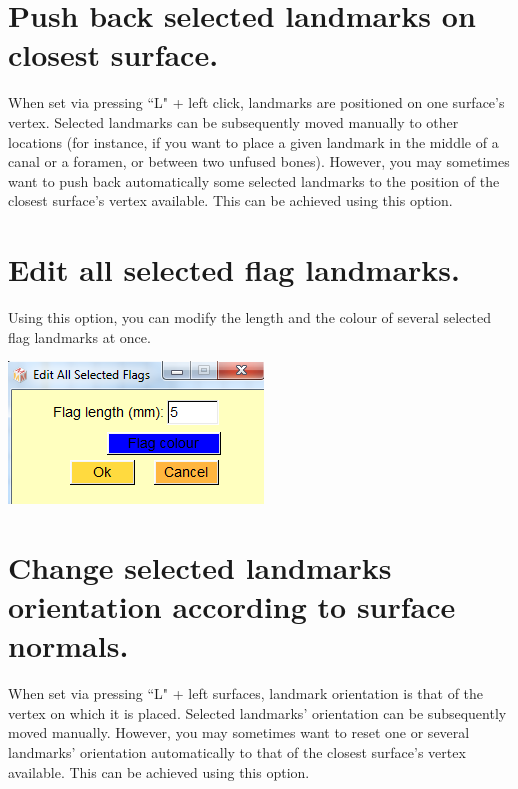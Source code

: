 \section{Push back selected landmarks on closest surface.}
When set via pressing ``L" + left click, landmarks are positioned on one surface’s vertex. Selected
landmarks can be subsequently moved manually to other locations (for instance, if you want to place
a given landmark in the middle of a canal or a foramen, or between two unfused bones). However,
you may sometimes want to push back automatically some selected landmarks to the position of the
closest surface’s vertex available. This can be achieved using this option.


\section{Edit all selected flag landmarks.}
\noindent
\begin{minipage}{0.5\textwidth}
Using this option, you can modify the length and the colour
of several selected flag landmarks at once.
\end{minipage}    
\begin{minipage}{0.5\textwidth}\centering
  \includegraphics[scale=0.5]{images/Edit_selected_landmarks/Edit_flags.png}
 \end{minipage} 
\noindent





\section{Change selected landmarks orientation according to surface normals.}
When set via pressing ``L" + left surfaces, landmark orientation is that of the vertex on which it is
placed. Selected landmarks’ orientation can be subsequently moved manually. However, you may
sometimes want to reset one or several landmarks’ orientation automatically to that of the closest
surface’s vertex available. This can be achieved using this option.



